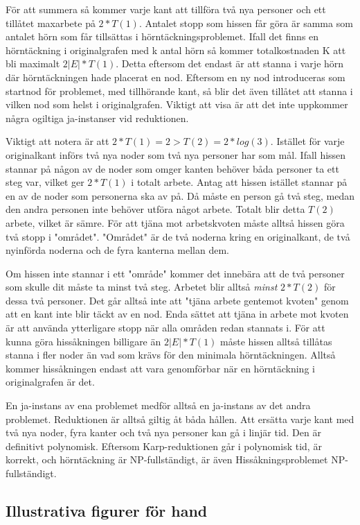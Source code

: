 \documentclass[a4paper,10pt,twoside]{article}
\begin{document}
För att summera så kommer varje kant att tillföra två nya personer och ett tillåtet maxarbete på $2*T(1)$. Antalet stopp som hissen får göra är samma som antalet hörn som får tillsättas i hörntäckningsproblemet. Ifall det finns en hörntäckning i originalgrafen med k antal hörn så kommer totalkostnaden K att bli maximalt $2|E|*T(1)$. Detta eftersom det endast är att stanna i varje hörn där hörntäckningen hade placerat en nod. Eftersom en ny nod introduceras som startnod för problemet, med tillhörande kant, så blir det även tillåtet att stanna i vilken nod som helst i originalgrafen. Viktigt att visa är att det inte uppkommer några ogiltiga ja-instanser vid reduktionen.

Viktigt att notera är att $2*T(1)=2 > T(2) = 2*log(3)$. Istället för varje originalkant införs två nya noder som två nya personer har som mål. Ifall hissen stannar på någon av de noder som omger kanten behöver båda personer ta ett steg var, vilket ger $2*T(1)$ i totalt arbete. Antag att hissen istället stannar på en av de noder som personerna ska av på. Då måste en person gå två steg, medan den andra personen inte behöver utföra något arbete. Totalt blir detta $T(2)$ arbete, vilket är sämre. För att tjäna mot arbetskvoten måste alltså hissen göra två stopp i "området". "Området" är de två noderna kring en originalkant, de två nyinförda noderna och de fyra kanterna mellan dem.

Om hissen inte stannar i ett "område" kommer det innebära att de två personer som skulle dit måste ta minst två steg. Arbetet blir alltså \emph{minst} $2*T(2)$ för dessa två personer. Det går alltså inte att "tjäna arbete gentemot kvoten" genom att en kant inte blir täckt av en nod. Enda sättet att tjäna in arbete mot kvoten är att använda ytterligare stopp när alla områden redan stannats i. För att kunna göra hissåkningen billigare än $2|E|*T(1)$ måste hissen alltså tillåtas stanna i fler noder än vad som krävs för den minimala hörntäckningen. Alltså kommer hissåkningen endast att vara genomförbar när en hörntäckning i originalgrafen är det.

En ja-instans av ena problemet medför alltså en ja-instans av det andra problemet. Reduktionen är alltså giltig åt båda hållen. Att ersätta varje kant med två nya noder, fyra kanter och två nya personer kan gå i linjär tid. Den är definitivt polynomisk. Eftersom Karp-reduktionen går i polynomisk tid, är korrekt, och hörntäckning är NP-fullständigt, är även Hissåkningsproblemet NP-fullständigt.

\subsection{Illustrativa figurer för hand}
\end{document}

